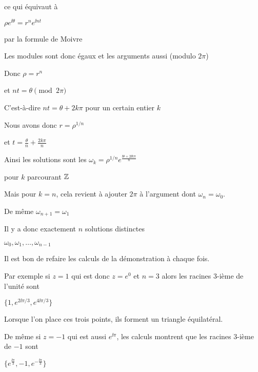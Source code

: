\change

ce qui équivaut à 

$\rho e^{\ii \theta}  = r^n e^{\ii nt}$

par la formule de Moivre

\change

Les modules sont donc égaux et les arguments aussi (modulo $2\pi$)

\change

Donc $\rho = r^n$

\change

et $nt = \theta \pmod {2\pi}$

\change

C'est-à-dire $nt = \theta + 2k\pi$
pour un certain entier $k$

\change

Nous avons donc $r = \rho^{1/n}$

\change

et $t = \frac{\theta}{n} + \frac{2k\pi}{n}$

\change

Ainsi les solutions sont les 
$\omega_k = \rho^{1/n} e^{\frac{\ii\theta + 2\ii k\pi}{n}}$

pour $k$ parcourant $\mathbb{Z}$


\change

Mais pour $k=n$, cela revient à ajouter $2\pi$ à l'argument
dont $\omega_n=\omega_0$.

De même $\omega_{n+1}=\omega_1$

Il y a donc exactement $n$ solutions distinctes

$\omega_0,\omega_1,\ldots,\omega_{n-1}$



\diapo

Il est bon de refaire les calculs de la démonstration à chaque fois.

Par exemple si $z=1$ qui est donc $z=e^0$
et $n=3$ alors les racines $3$-ième de l'unité sont

$\{1,e^{2\ii \pi/3},e^{4\ii \pi/3}\}$

\change

Lorsque l'on place ces trois points, ils forment un triangle équilatéral.

\change

De même si $z=-1$ qui est aussi $e^{\ii \pi}$, les calculs montrent que les 
racines $3$-ième de $-1$ sont 

$\{ e^{\frac{\ii\pi}{3}}, -1, e^{-\frac{\ii\pi}{3}} \}$

